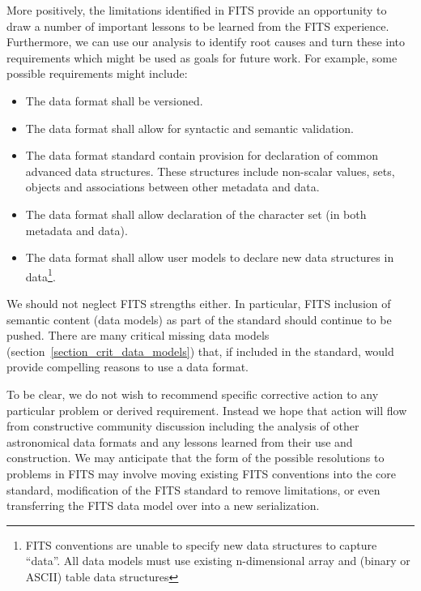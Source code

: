 \documentclass[final,authoryear,5p,times,twocolumn]{elsarticle}
\begin{document}
{{More positively, the limitations identified in FITS provide an opportunity 
to draw a number of important lessons to be learned from the FITS experience. 
Furthermore, we can use our analysis to identify root causes and turn 
these into requirements which might be used as goals for future work.  
For example, some possible requirements might include:

\begin{itemize}

\item The data format shall be versioned.

\item The data format shall allow for syntactic and semantic validation.

\item The data format standard contain provision for declaration of common 
advanced data structures. These structures include non-scalar values, sets, 
objects and associations between other metadata and data.

\item The data format shall allow declaration of the character set 
(in both metadata and data).

\item The data format shall allow user models to declare new data structures
in data\footnote{FITS conventions are unable to specify new 
data structures to capture ``data''. All data models must use existing 
n-dimensional array and (binary or ASCII) table data structures}.

\end{itemize}

We should not neglect FITS strengths either. In particular, FITS inclusion of 
semantic content (data models) as part of the standard should continue to be 
pushed. There are many critical missing data models 
(section~\ref{section_crit_data_models}) that, if included in the standard, 
would provide compelling reasons to use a data format.


To be clear, we do not wish to recommend specific corrective action 
to any particular problem or derived requirement. Instead we hope that 
action will flow from constructive community discussion including the analysis 
of other astronomical data formats and any lessons learned from their use
and construction.
We may anticipate that the form of the possible resolutions to problems in FITS may 
involve moving existing FITS conventions into the core standard, modification of 
the FITS standard to remove limitations, or even transferring the FITS data model over
into a new serialization. 


}}
\end{document}
